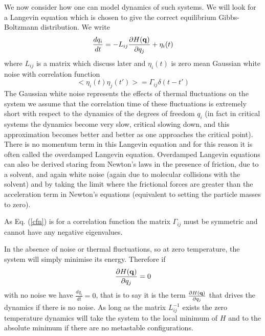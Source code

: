 We now consider how one can model dynamics of such systems. We will look for a Langevin equation which is chosen to give the correct equilibrium Gibbs-Boltzmann distribution. We write
\begin{equation}
\frac{d q_i}{dt} = -L_{ij}\frac{\partial H({\bf q})}{ \partial q_j} + \eta_i(t)
\end{equation}
where $L_{ij}$ is a matrix which discuss later and $\eta_i(t)$ is zero mean Gaussian white noise with correlation function 
\begin{equation}
< \eta_i(t)\eta_j(t')> = \Gamma_{ij} \delta(t-t')
\label{cfn}
\end{equation}
The Gaussian white noise represents the effects of thermal fluctuations on the system we assume that the correlation time of these fluctuations is extremely short with respect to the dynamics of the degrees of freedom $q_i$ (in fact in critical systems the dynamics become very slow, critical slowing down, and this approximation becomes better and better as one approaches the critical point). There is no momentum term in this Langevin equation and for this reason it is often called the overdamped Langevin equation. Overdamped Langevin equations can also be derived staring from Newton's laws in the presence of friction, due to a solvent, and again white noise (again due to molecular collisions with the solvent) and by taking the limit where the frictional forces are greater than the acceleration term in Newton's equations (equivalent to setting the particle masses to zero).


As Eq. (\ref{cfn}) is for a correlation function the matrix $\Gamma_{ij}$ must be symmetric and cannot have any negative eigenvalues.

In the absence of noise or thermal fluctuations, so at zero temperature, the system will simply minimise its energy. Therefore if 
\begin{equation}
\frac{\partial H({\bf q})}{ \partial q_j} =0
\end{equation}
with no noise we have $\frac{d q_i}{dt}=0$, that is to say it is the term $\frac{\partial H({\bf q})}{ \partial q_j}$ that drives the dynamics if there is no noise. As long as the matrix $L_{ij}^{-1}$ exists the zero temperature dynamics will take the system to the local minimum of $H$ and to the absolute minimum if there are no metastable configurations. 


